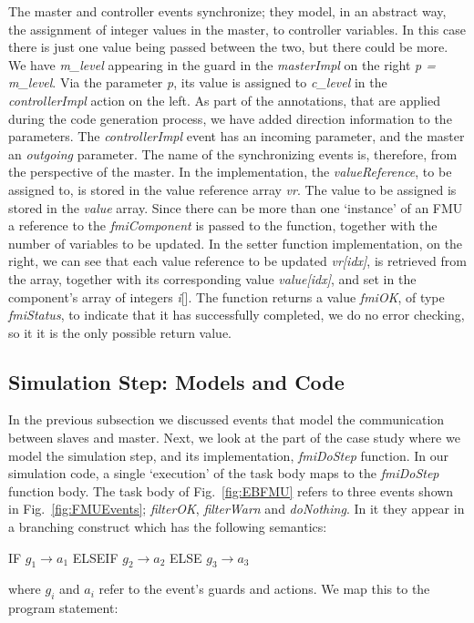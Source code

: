 \documentclass{llncs}%
\begin{document}
The master and controller events synchronize; they model, in an abstract way, the assignment of integer values in the master, to controller variables. In this case there is just one value being passed between the two, but there could be more. We have  \emph{m\_level} appearing in the guard in the \emph{masterImpl} on the right  \emph{p = m\_level}. Via the parameter \emph{p}, its value is assigned to \emph{c\_level} in the \emph{controllerImpl} action on the left. As part of the annotations, that are applied during the code generation process, we have added direction information to the parameters. The \emph{controllerImpl} event has an incoming parameter, and the master an \emph{outgoing} parameter. The name of the synchronizing events is, therefore, from the perspective of the master. In the implementation, the \emph{valueReference}, to be assigned to, is stored in the value reference array \emph{vr}. The value to be assigned is stored in the \emph{value} array. Since there can be more than one `instance' of an FMU a reference to the \emph{fmiComponent} is passed to the function, together with the number of variables to be updated. In the setter function implementation, on the right, we can see that each value reference to be updated \emph{vr[idx]}, is retrieved from the array, together with its corresponding value \emph{value[idx]}, and set in the component's array of integers \emph{i}[]. The function returns a value \emph{fmiOK}, of type \emph{fmiStatus}, to indicate that it has successfully completed, we do no error checking, so it it is the only possible return value.

\subsection{Simulation Step: Models and Code} 
In the previous subsection we discussed events that model the communication between slaves and master. Next, we look at the part of the case study where we model the simulation step, and its implementation, \emph{fmiDoStep} function. In our simulation code, a single `execution' of the task body maps to the \emph{fmiDoStep} function body. The task body of Fig.~\ref{fig:EBFMU} refers to three events shown in Fig.~\ref{fig:FMUEvents}; \emph{filterOK}, \emph{filterWarn} and \emph{doNothing}. In it they appear in a branching construct which has the following semantics:
%
\begin{minipage}{\textwidth}
\centering
IF $g_1\rightarrow a_1$ ELSEIF $g_2\rightarrow a_2$ ELSE $g_3\rightarrow a_3$
\end{minipage}
where $g_i$ and $a_i$ refer to the event's guards and actions. We map this to the program statement:
\end{document}
